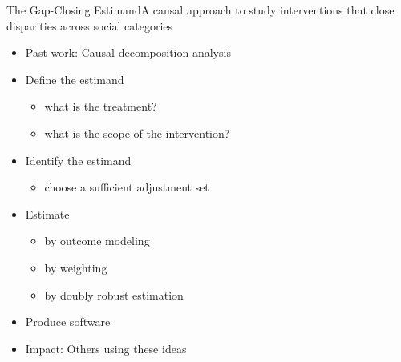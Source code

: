 \documentclass{beamer}
\newcommand\bblue[1]{{\color{blue}\textbf{#1}}}
\begin{document}
{\begin{frame}
\end{frame}

\begin{frame}{The Gap-Closing Estimand}{A causal approach to study interventions that close disparities across social categories}

\begin{itemize}
\item Past work: Causal decomposition analysis
\item Define the estimand
\begin{itemize}
\item what is the treatment?
\item what is the scope of the intervention? \hfill {}
\end{itemize}
\item Identify the estimand
\begin{itemize}
\item choose a sufficient adjustment set
\end{itemize}
\item Estimate
\begin{itemize}
\item by outcome modeling
\item by weighting
\item by doubly robust estimation \hfill {}
\end{itemize}
\item Produce software \hfill {}
\item Impact: Others using these ideas
\end{itemize}

\end{frame}

}
\end{document}
